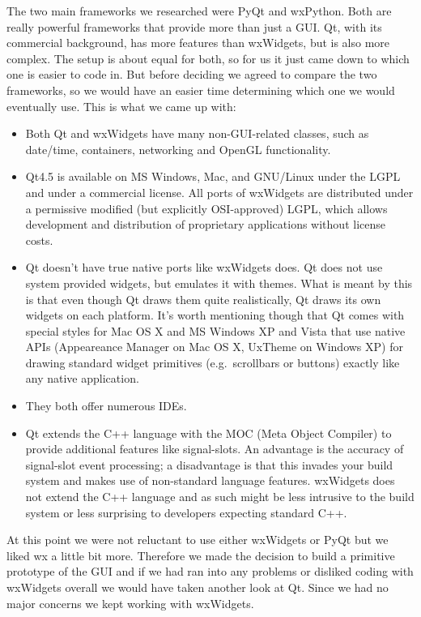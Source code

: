 The two main frameworks we researched were PyQt and wxPython. Both are really powerful frameworks that provide more than just a GUI\@. Qt, with its commercial background, has more features than wxWidgets, but is also more complex. The setup is about equal for both, so for us it just came down to which one is easier to code in. But before deciding we agreed to compare the two frameworks, so we would have an easier time determining which one we would eventually use. This is what we came up with:

\begin{itemize}
	\item Both Qt and wxWidgets have many non-GUI-related classes, such as date/time, containers, networking and OpenGL functionality.
	\item Qt4.5 is available on MS Windows, Mac, and GNU/Linux under the LGPL and under a commercial license. All ports of wxWidgets are distributed under a permissive modified (but explicitly OSI-approved) LGPL, which allows development and distribution of proprietary applications without license costs.
	\item Qt doesn't have true native ports like wxWidgets does. Qt does not use system provided widgets, but emulates it with themes. What is meant by this is that even though Qt draws them quite realistically, Qt draws its own widgets on each platform. It's worth mentioning though that Qt comes with special styles for Mac OS X and MS Windows XP and Vista that use native APIs (Appeareance Manager on Mac OS X, UxTheme on Windows XP) for drawing standard widget primitives (e.g.\ scrollbars or buttons) exactly like any native application.
	\item They both offer numerous IDEs.
	\item Qt extends the C++ language with the MOC (Meta Object Compiler) to provide additional features like signal-slots. An advantage is the accuracy of signal-slot event processing; a disadvantage is that this invades your build system and makes use of non-standard language features\@. wxWidgets does not extend the C++ language and as such might be less intrusive to the build system or less surprising to developers expecting standard C++.
\end{itemize}

At this point we were not reluctant to use either wxWidgets or PyQt but we liked wx a little bit more. Therefore we made the decision to build a primitive prototype of the GUI and if we had ran into any problems or disliked coding with wxWidgets overall we would have taken another look at Qt. Since we had no major concerns we kept working with wxWidgets.

